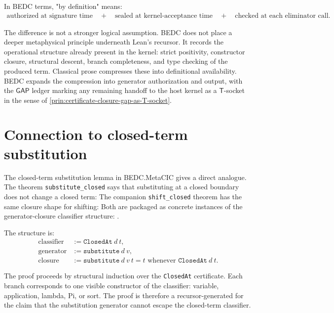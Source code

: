 In BEDC terms, "by definition" means:
$$
\begin{aligned}
\text{authorized at signature time}
\quad+\quad
\text{sealed at kernel-acceptance time}
\quad+\quad
\text{checked at each eliminator call}.
\end{aligned}
$$

The difference is not a stronger logical assumption. BEDC does not place a deeper metaphysical principle underneath Lean's recursor. It records the operational structure already present in the kernel: strict positivity, constructor closure, structural descent, branch completeness, and type checking of the produced term. Classical prose compresses these into definitional availability. BEDC expands the compression into generator authorization and \NameCert{} output, with the $\mathsf{GAP}$ ledger marking any remaining handoff to the host kernel as a $\mathsf{T}$-socket in the sense of \autoref{prin:certificate-closure-gap-as-T-socket}.

\section{Connection to closed-term substitution}
\label{sec:recursor-closed-term-substitution}

The closed-term substitution lemma in BEDC.MetaCIC gives a direct analogue. The theorem \texttt{substitute\_closed} says that substituting at a closed boundary does not change a closed term:
The companion \texttt{shift\_closed} theorem has the same closure shape for shifting:
Both are packaged as concrete instances of the generator-closure classifier structure:   .

The structure is:
$$
\begin{aligned}
\text{classifier} &:= \texttt{ClosedAt}\ d\ t,\\
\text{generator} &:= \texttt{substitute}\ d\ v,\\
\text{closure} &:= \texttt{substitute}\ d\ v\ t = t
  \text{ whenever } \texttt{ClosedAt}\ d\ t.
\end{aligned}
$$

The proof proceeds by structural induction over the \texttt{ClosedAt} certificate. Each branch corresponds to one visible constructor of the classifier: variable, application, lambda, Pi, or sort. The proof is therefore a recursor-generated \NameCert{} for the claim that the substitution generator cannot escape the closed-term classifier.

